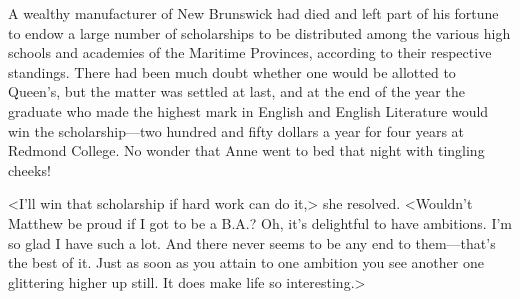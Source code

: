 A wealthy manufacturer of New Brunswick had died and left part of his fortune to endow a large number of scholarships to be distributed among the various high schools and academies of the Maritime Provinces, according to their respective standings. There had been much doubt whether one would be allotted to Queen's, but the matter was settled at last, and at the end of the year the graduate who made the highest mark in English and English Literature would win the scholarship—two hundred and fifty dollars a year for four years at Redmond College. No wonder that Anne went to bed that night with tingling cheeks!

<I'll win that scholarship if hard work can do it,> she resolved. <Wouldn't Matthew be proud if I got to be a B\@.A\@.? Oh, it's delightful to have ambitions. I'm so glad I have such a lot. And there never seems to be any end to them—that's the best of it. Just as soon as you attain to one ambition you see another one glittering higher up still. It does make life so interesting.>